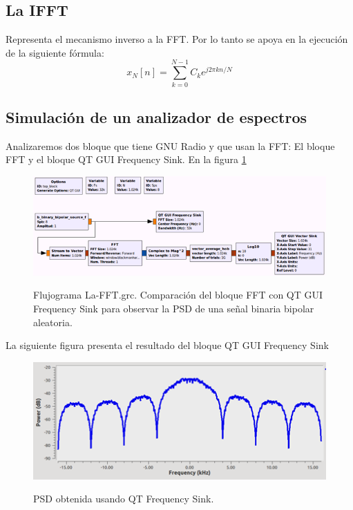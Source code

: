 \subsection{La IFFT}
Representa el mecanismo inverso a la FFT. Por lo tanto se apoya en la ejecución de la siguiente fórmula:\\

\begin{equation} \label{capdos_uno}
	 x_{N}[n] =  \sum_{k=0}^{N-1}C_{k}e^{j2 \pi kn/N}
\end{equation}

\subsection{Simulación de un analizador de espectros}

Analizaremos dos bloque que tiene GNU Radio y que usan la FFT: El bloque FFT y el bloque QT GUI Frequency Sink. En la figura \ref{fig:la-FFT} 

\begin{figure}[h!]
	\captionsetup{justification = raggedright, singlelinecheck = false}
	\caption{Flujograma La-FFT.grc. Comparación del bloque FFT con QT GUI Frequency Sink para observar la PSD de una señal binaria bipolar aleatoria.} 
	\centering
	\includegraphics[scale=1]{Imagenes/La-FFT.png}
	\label{fig:la-FFT}
\end{figure}

La siguiente figura presenta el resultado del bloque QT GUI Frequency Sink

\begin{figure}[h!]
	\captionsetup{justification = raggedright, singlelinecheck = false}
	\caption{PSD obtenida usando QT Frequency Sink.} 
	\centering
	\includegraphics[scale=1]{Imagenes/PSD-QT.png}
	\label{fig:la-PSD-QT}
\end{figure}

